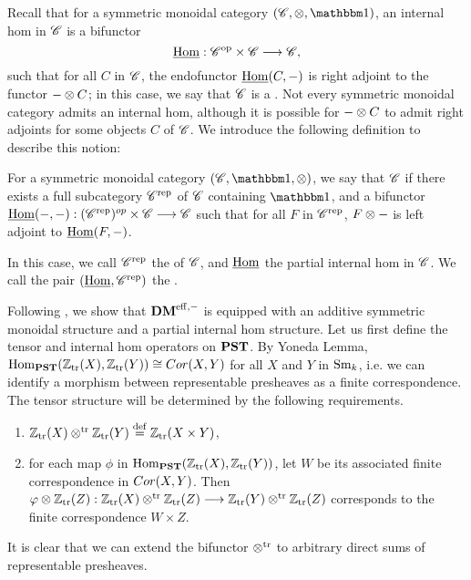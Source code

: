 Recall that for a symmetric monoidal category $(\Cat{C}, \tensor, 
\Unit)$, an internal hom in $\mathscr{C}$ is a bifunctor
\[
\underline{\mathrm{Hom}}: \mathscr{C}^{\mathrm{op}} \times \mathscr{C} \longrightarrow \mathscr{C},
\]
such that for all $C$ in $\mathscr{C}$, the endofunctor $\underline{\mathrm{Hom}}(C, -)$
is right adjoint to the functor $- \otimes C$; in this case, we
say that $\mathscr{C}$ is a .  Not every 
symmetric monoidal category admits an internal hom, although it is
possible for $- \otimes C$ to admit right adjoints for some
objects $C$ of $\mathscr{C}$. We introduce the following definition to
describe this notion:

\begin{defn}\label{def_partial_internal_hom}
For a symmetric monoidal category $(\Cat{C}, \Unit, \tensor)$,
we say that $\mathscr{C}$  if 
there exists a full subcategory $\mathscr{C}^{\mathrm{rep}}$ of $\mathscr{C}$
containing $\Unit$, and a bifunctor $\underline{\mathrm{Hom}}(-,-) : 
(\mathscr{C}^{\mathrm{rep}})^{op} \times \mathscr{C} \longrightarrow \mathscr{C}$ such that for
all $F$ in $\mathscr{C}^{\mathrm{rep}}$, $F \otimes -$ is left adjoint to 
$\underline{\mathrm{Hom}}(F, -)$. 

In this case, we call $\mathscr{C}^{\mathrm{rep}}$ the  of $\mathscr{C}$, and $\underline{\mathrm{Hom}}$ the partial internal hom 
in $\mathscr{C}$. We call the pair $(\underline{\mathrm{Hom}}, \mathscr{C}^{\mathrm{rep}})$ the 
.
\end{defn}

Following \cite{MVW}, we show that $\mathbf{DM}^{\mathrm{eff},-}$ is equipped with an 
additive symmetric monoidal structure and a partial internal hom
structure. Let us first define the tensor and internal hom operators on 
$\mathbf{PST}$. By Yoneda Lemma, $\mathrm{Hom}_{\mathbf{PST}}(\mathbb{Z}_{\mathrm{tr}}(X), \mathbb{Z}_{\mathrm{tr}}(Y)) 
\cong Cor(X, Y)$ for all $X$ and $Y$ in $\mathrm{Sm}_{k}$, i.e. we can 
identify a morphism between representable presheaves as a finite
correspondence. The tensor structure will be determined by the following
requirements. 

\begin{enumerate}
\item $\mathbb{Z}_{\mathrm{tr}}(X) \otimes^{\mathrm{tr}} \mathbb{Z}_{\mathrm{tr}}(Y) \stackrel{\mathrm{def}}{=} \mathbb{Z}_{\mathrm{tr}}(X \times Y)$, 

\item for each map $\phi$ in $\mathrm{Hom}_{\mathbf{PST}}(\mathbb{Z}_{\mathrm{tr}}(X), \mathbb{Z}_{\mathrm{tr}}(Y))$, let
$W$ be its associated finite correspondence in $Cor(X, Y)$. Then 
$\varphi \otimes \mathbb{Z}_{\mathrm{tr}}(Z): \mathbb{Z}_{\mathrm{tr}}(X) \otimes^{\mathrm{tr}} \mathbb{Z}_{\mathrm{tr}}(Z) \longrightarrow \mathbb{Z}_{\mathrm{tr}}(Y) \otimes^{\mathrm{tr}} \mathbb{Z}_{\mathrm{tr}}(Z)$
corresponds to the finite correspondence $W \times Z$. 
\end{enumerate}
\noindent It is clear that we can extend the bifunctor $\otimes^{\mathrm{tr}}$ to 
arbitrary direct sums of representable presheaves.  

